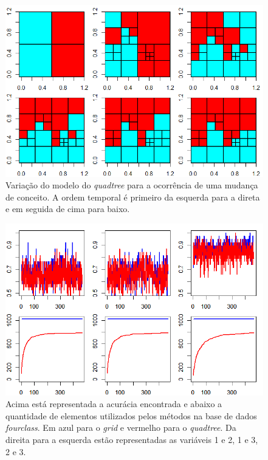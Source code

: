 \documentclass[conference]{IEEEtran}
\begin{document}
\begin{figure}[h]
\centerline{\includegraphics[width=1\columnwidth]{fig/drift_tmodel.png}}
\caption{Variação do modelo do \textit{quadtree} para a ocorrência de uma mudança de conceito. A ordem temporal é primeiro da esquerda para a direta e em seguida de cima para baixo.}
\label{drifttmodel}
\end{figure}

\begin{figure}[h]
\centerline{\includegraphics[width=1\columnwidth]{fig/sea_acc.png}}
\caption{Acima está representada a acurácia encontrada e abaixo a quantidade de elementos utilizados pelos métodos na base de dados \textit{fourclass}. Em azul para o \textit{grid} e vermelho para o \textit{quadtree}. Da direita para a esquerda  estão representadas as variáveis 1 e 2, 1 e 3, 2 e 3.}
\label{seaacc}
\end{figure}
\end{document}
